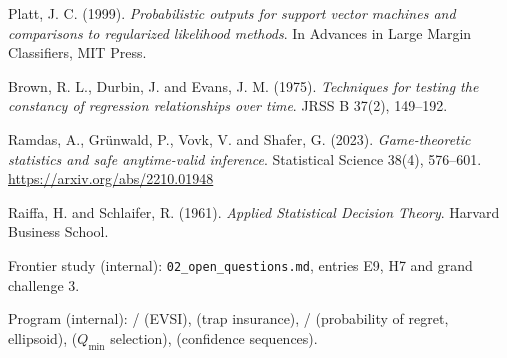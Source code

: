 \begin{enumerate}[label={[\arabic*]},leftmargin=2.5em]
\item Platt, J. C. (1999). \emph{Probabilistic outputs for support vector machines and comparisons to regularized likelihood methods}. In Advances in Large Margin Classifiers, MIT Press.
\item Brown, R. L., Durbin, J. and Evans, J. M. (1975). \emph{Techniques for testing the constancy of regression relationships over time}. JRSS B 37(2), 149--192.
\item Ramdas, A., Gr\"unwald, P., Vovk, V. and Shafer, G. (2023). \emph{Game-theoretic statistics and safe anytime-valid inference}. Statistical Science 38(4), 576--601. \url{https://arxiv.org/abs/2210.01948}
\item Raiffa, H. and Schlaifer, R. (1961). \emph{Applied Statistical Decision Theory}. Harvard Business School.
\item Frontier study (internal): \texttt{02\_open\_questions.md}, entries E9, H7 and grand challenge 3.
\item Program (internal): / (EVSI),  (trap insurance), / (probability of regret, ellipsoid),  ($Q_{\min}$ selection),  (confidence sequences).
\end{enumerate}
\endgroup
